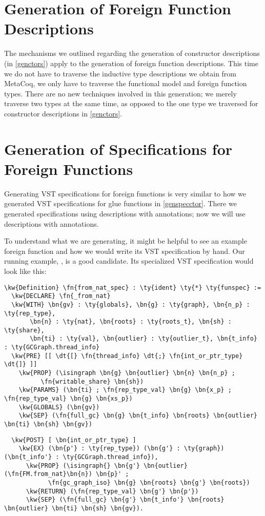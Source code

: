 \section{Generation of Foreign Function Descriptions}
\label{genprims}

The mechanisms we outlined regarding the generation of constructor descriptions (in \autoref{genctors}) apply to the generation of foreign function descriptions. This time we do not have to traverse the inductive type descriptions we obtain from MetaCoq, we only have to traverse the \gls{functional model} and \gls{foreign function} types. There are no new techniques involved in this generation; we merely traverse two types at the same time, as opposed to the one type we traversed for constructor descriptions in \autoref{genctors}.


\section{Generation of Specifications for Foreign Functions}
\label{genspecprim}

Generating VST specifications for foreign functions is very similar to how we generated VST specifications for \constructor{} glue functions in \autoref{genspecctor}. There we generated specifications using \reified{} descriptions with \ctorann{} annotations; now we will use \reified{} descriptions with \foreignann{} annotations.

To understand what we are generating, it might be helpful to see an example \gls{foreign function} and how we would write its VST specification by hand. Our running example, , is a good candidate. Its specialized VST specification would look like this:

\begin{Verbatim}
\kw{Definition} \fn{from_nat_spec} : \ty{ident} \ty{*} \ty{funspec} :=
  \kw{DECLARE} \fn{_from_nat}
  \kw{WITH} \bn{gv} : \ty{globals}, \bn{g} : \ty{graph}, \bn{n_p} : \ty{rep_type},
       \bn{n} : \ty{nat}, \bn{roots} : \ty{roots_t}, \bn{sh} : \ty{share},
       \bn{ti} : \ty{val}, \bn{outlier} : \ty{outlier_t}, \bn{t_info} : \ty{GCGraph.thread_info}
  \kw{PRE} [[ \dt{[} \fn{thread_info} \dt{;} \fn{int_or_ptr_type} \dt{]} ]]
    \kw{PROP} (\isingraph \bn{g} \bn{outlier} \bn{n} \bn{n_p} ;
          \fn{writable_share} \bn{sh})
    \kw{PARAMS} (\bn{ti} ; \fn{rep_type_val} \bn{g} \bn{x_p} ; \fn{rep_type_val} \bn{g} \bn{xs_p})
    \kw{GLOBALS} (\bn{gv})
    \kw{SEP} (\fn{full_gc} \bn{g} \bn{t_info} \bn{roots} \bn{outlier} \bn{ti} \bn{sh} \bn{gv})
\end{Verbatim}
\newpage
\begin{Verbatim}
  \kw{POST} [ \bn{int_or_ptr_type} ]
    \kw{EX} (\bn{p'} : \ty{rep_type}) (\bn{g'} : \ty{graph}) (\bn{t_info'} : \ty{GCGraph.thread_info}),
      \kw{PROP} (\isingraph{} \bn{g'} \bn{outlier} (\fn{FM.from_nat}\bn{n}) \bn{p}' ;
            \fn{gc_graph_iso} \bn{g} \bn{roots} \bn{g'} \bn{roots})
      \kw{RETURN} (\fn{rep_type_val} \bn{g'} \bn{p'})
      \kw{SEP} (\fn{full_gc} \bn{g'} \bn{t_info'} \bn{roots} \bn{outlier} \bn{ti} \bn{sh} \bn{gv}).
\end{Verbatim}

